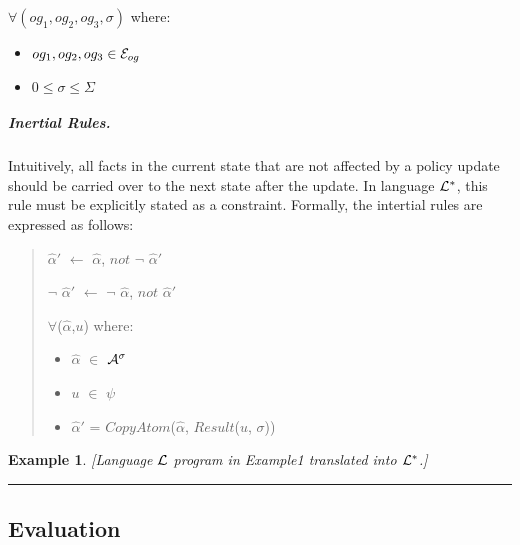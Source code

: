 \documentclass[10pt, twocolumn]{article}
\newtheorem{examp}{Example}
\newenvironment{example}{\begin{examp}\rm}{\rule{2mm}{2mm}\end{examp}}
\begin{document}
\begin{enumerate}
                $\forall (og_{1}, og_{2}, og_{3}, \sigma)$ where:

                \begin{itemize}
                  \item
                    $og_{1}, og_{2}, og_{3} \in {\cal E}_{og}$
                  \item
                    $0 \leq \sigma \leq \Sigma$
                \end{itemize}
            \end{enumerate}

          \subparagraph{Inertial Rules.}

            Intuitively, all facts in the current state that are not affected
            by a policy update should be carried over to the next state after
            the update. In language ${\cal L}^{*}$, this rule must be
            explicitly stated as a constraint. Formally, the intertial rules
            are expressed as follows:

            \begin{quote}
              $\hat{\alpha}'$ $\leftarrow$ $\hat{\alpha}$, $not$ $\lnot$ $\hat{\alpha}'$

              $\lnot$ $\hat{\alpha}'$ $\leftarrow$ $\lnot$ $\hat{\alpha}$, $not$ $\hat{\alpha}'$

              $\forall$($\hat{\alpha}$,$u$) where:

              \begin{itemize}
                \item
                  $\hat{\alpha}$ $\in$ ${\cal A}^{\sigma}$
                \item
                  $u$ $\in$ $\psi$
                \item
                  $\hat{\alpha}'$ = $CopyAtom$($\hat{\alpha}$, $Result$($u$, $\sigma$))
              \end{itemize}
            \end{quote}

        \begin{example}
          [Language ${\cal L}$ program in Example1 translated into
          ${\cal L}^{*}$.]

        \end{example}

      \subsection{Evaluation}
\end{document}
